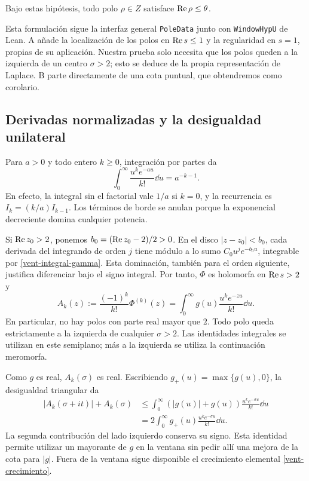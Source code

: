 \begin{proposicion}
\label{vent-criterio}
Bajo estas hipótesis, todo polo $\rho\in Z$ satisface
$\operatorname{Re}\rho\le\theta$.
\end{proposicion}

Esta formulación sigue la interfaz general \texttt{PoleData} junto con
\texttt{WindowHypU} de Lean. A añade la localización de los polos en
$\operatorname{Re} s\le1$ y la regularidad en $s=1$, propias de su aplicación.
Nuestra prueba solo necesita que los polos queden a la izquierda de un
centro $\sigma>2$; esto se deduce de la propia representación de Laplace.
B parte directamente de una cota puntual, que obtendremos como corolario.

\subsection{Derivadas normalizadas y la desigualdad unilateral}

Para $a>0$ y todo entero $k\ge0$, integración por partes da
\begin{equation}
 \int_0^\infty\frac{u^ke^{-au}}{k!}\dd u=a^{-k-1}.
 \label{vent-integral-gamma}
\end{equation}
En efecto, la integral sin el factorial vale $1/a$ si $k=0$, y la
recurrencia es $I_k=(k/a)I_{k-1}$. Los términos de borde se anulan
porque la exponencial decreciente domina cualquier potencia.

Si $\operatorname{Re} z_0>2$, ponemos $b_0=(\operatorname{Re} z_0-2)/2>0$.
En el disco $|z-z_0|<b_0$, cada derivada del integrando de orden $j$
tiene módulo a lo sumo $C_0u^je^{-b_0u}$, integrable por
\eqref{vent-integral-gamma}. Esta dominación, también para el orden
siguiente, justifica diferenciar bajo el signo integral. Por tanto,
$\Phi$ es holomorfa en $\operatorname{Re} s>2$ y
\begin{equation}
 A_k(z):=\frac{(-1)^k}{k!}\Phi^{(k)}(z)
 =\int_0^\infty g(u)\frac{u^ke^{-zu}}{k!}\dd u.
 \label{vent-derivadas}
\end{equation}
En particular, no hay polos con parte real mayor que $2$.
Todo polo queda estrictamente a la izquierda de cualquier $\sigma>2$.
Las identidades integrales se utilizan en este semiplano; más a la
izquierda se utiliza la continuación meromorfa.

Como $g$ es real, $A_k(\sigma)$ es real. Escribiendo
$g_+(u)=\max\{g(u),0\}$, la desigualdad triangular da
\begin{equation}
 \begin{aligned}
 |A_k(\sigma+it)|+A_k(\sigma)
 &\le\int_0^\infty (|g(u)|+g(u))
           \frac{u^ke^{-\sigma u}}{k!}\dd u\\
 &=2\int_0^\infty g_+(u)\frac{u^ke^{-\sigma u}}{k!}\dd u.
 \end{aligned}
 \label{vent-unilateral}
\end{equation}
La segunda contribución del lado izquierdo conserva su signo. Esta
identidad permite utilizar un mayorante de $g$ en la ventana sin pedir
allí una mejora de la cota para $|g|$. Fuera de la ventana sigue disponible
el crecimiento elemental \eqref{vent-crecimiento}.

